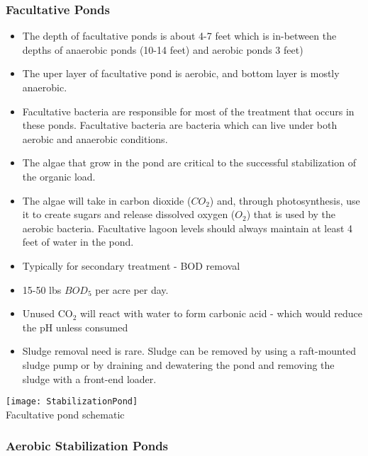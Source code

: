 \subsubsection{Facultative Ponds}	

\begin{itemize}
\item The depth of facultative ponds is about 4-7 feet which is in-between the depths of anaerobic ponds (10-14 feet) and aerobic ponds 3 feet)
\item The uper layer of facultative pond is aerobic, and bottom layer is mostly anaerobic.
\item Facultative bacteria are responsible for most of the treatment that occurs in these ponds.  Facultative bacteria are bacteria which can live under both aerobic and anaerobic conditions.
\item The algae that grow in the pond are critical to the successful stabilization of the organic load. 
\item The algae will take in carbon dioxide ($CO_2$) and, through photosynthesis, use it to create sugars and release dissolved oxygen ($O_2$) that is used by the aerobic bacteria. Facultative lagoon levels should always maintain at least 4 feet of water in the pond.
\item Typically for secondary treatment - BOD removal
\item 15-50 lbs $BOD_5$ per acre per day.
\item Unused CO$_2$ will react with water to form carbonic acid - which would reduce the pH unless consumed
\item Sludge removal need is rare.  Sludge can be removed by using a raft-mounted sludge pump or by draining and dewatering the pond and removing the sludge with a front-end loader.
\end{itemize} 

				\begin{sidewaysfigure}
\begin{center}
\texttt{[image: StabilizationPond]}\\
Facultative pond schematic
\end{center}
				\end{sidewaysfigure}
				
\subsubsection{Aerobic Stabilization Ponds}
	
